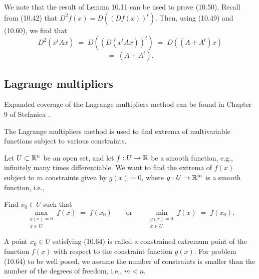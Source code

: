 
We note that the result of Lemma 10.11 can be used to prove (10.50). Recall from
(10.42) that $D^2f(x) = D((Df(x))^t)$. Then, using (10.49) and (10.60), we find that
\[
D^2(x^tAx) \;=\; D\left((D(x^tAx))^t\right) \;=\; D\left((A+A^t)x\right)
\]
\[
=\; (A+A^t).
\]

\subsection{Lagrange multipliers}

Expanded coverage of the Lagrange multipliers method can be found in Chapter 9 of
Stefanica \cite{36}.

The Lagrange multipliers method is used to find extrema of multivariable functions
subject to various constraints.

Let $U \subset \mathbb{R}^n$ be an open set, and let $f : U \to \mathbb{R}$ be a smooth function,
e.g., infinitely many times differentiable. We want to find the extrema of $f(x)$
subject to $m$ constraints given by $g(x) = 0$, where $g : U \to \mathbb{R}^m$ is a smooth
function, i.e.,

Find $x_0 \in U$ such that
\begin{equation}
\max_{\substack{g(x)=0 \\ x\in U}} f(x) \;=\; f(x_0) \qquad \text{or} \qquad
\min_{\substack{g(x)=0 \\ x\in U}} f(x) \;=\; f(x_0).
\end{equation}

A point $x_0 \in U$ satisfying (10.64) is called a constrained extremum point of the
function $f(x)$ with respect to the constraint function $g(x)$. For problem (10.64)
to be well posed, we assume the number of constraints is smaller than the number of
the degrees of freedom, i.e., $m < n$.

